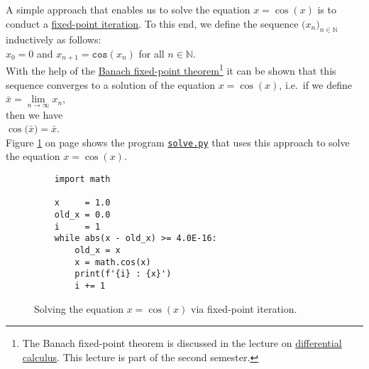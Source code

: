 A simple approach that enables us to solve the equation $x = \cos(x)$ is to conduct a
\href{https://en.wikipedia.org/wiki/Fixed-point_iteration}{fixed-point iteration}.  To this end, we
define the sequence $\bigl(x_n\bigr)_{n\in\mathbb{N}}$ inductively as follows:
\\[0.2cm]
\hspace*{1.3cm} 
$x_0 = 0$ \quad and \quad $x_{n+1} = \mathtt{cos}(x_n)$ \quad for all $n \in \mathbb{N}$. 
\\[0.2cm]
With the help of the 
\href{https://en.wikipedia.org/wiki/Banach_fixed-point_theorem}{Banach fixed-point theorem}\footnote{
  The Banach fixed-point theorem is discussed in the lecture on
  \href{https://en.wikipedia.org/wiki/Differential_calculus}{differential calculus}.  This lecture is part of the
  second semester.
}
it can be shown that this sequence converges to a solution of the equation $x = \cos(x)$, i.e.~if we define
\\[0.2cm]
\hspace*{1.3cm}
$\bar{x} = \lim\limits_{n\rightarrow\infty} x_n$,
\\[0.2cm]
then we have
\\[0.2cm]
\hspace*{1.3cm}
$\cos\bigl(\bar{x}\bigr) = \bar{x}$.
\\[0.2cm]
Figure \ref{fig:solve.py} on page \pageref{fig:solve.py} shows the program
\href{https://github.com/karlstroetmann/Logic/blob/master/Python/solve.py}{\texttt{solve.py}}
that uses this approach to solve the equation $x = \cos(x)$.


\begin{figure}[!ht]
  \centering
\begin{verbatim}
    import math
    
    x     = 1.0
    old_x = 0.0
    i     = 1
    while abs(x - old_x) >= 4.0E-16:
        old_x = x
        x = math.cos(x)
        print(f'{i} : {x}')
        i += 1
\end{verbatim} 
\vspace*{-0.3cm}
\caption{Solving the equation $x = \cos(x)$ via fixed-point iteration.}  \label{fig:solve.py}
\end{figure} %

